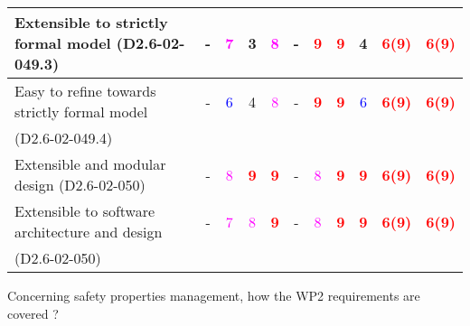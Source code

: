 \begin{tabular}{|l | c | c | c | c | c | c | c | c | c | c |}
\hline
Extensible to strictly formal model (D2.6-02-049.3) & - & \textcolor{magenta}{7} & 3     & \textcolor{magenta}{8} & - & \textcolor{red}{\textbf{9}} & \textcolor{red}{\textbf{9}} & 4     & \textcolor{red}{\textbf{6(9)}}  & \textcolor{red}{\textbf{6(9)}}  \\
\hline
Easy to  refine towards strictly formal model & - & \textcolor{blue}{6} & 4     & \textcolor{magenta}{8} & - & \textcolor{red}{\textbf{9}} & \textcolor{red}{\textbf{9}} & \textcolor{blue}{6} & \textcolor{red}{\textbf{6(9)}}  & \textcolor{red}{\textbf{6(9)}}  \\
(D2.6-02-049.4)  &  &      &  &  & & &  &    &   &   \\
\hline
Extensible and modular design (D2.6-02-050) & - & \textcolor{magenta}{8} & \textcolor{red}{\textbf{9}} & \textcolor{red}{\textbf{9}} & - & \textcolor{magenta}{8} & \textcolor{red}{\textbf{9}} & \textcolor{red}{\textbf{9}} & \textcolor{red}{\textbf{6(9)}}  & \textcolor{red}{\textbf{6(9)}}  \\
\hline
Extensible to software architecture and design  & - & \textcolor{magenta}{7} & \textcolor{magenta}{8} & \textcolor{red}{\textbf{9}} & - & \textcolor{magenta}{8} & \textcolor{red}{\textbf{9}} & \textcolor{red}{\textbf{9}} & \textcolor{red}{\textbf{6(9)}}  & \textcolor{red}{\textbf{6(9)}}  \\
(D2.6-02-050) &  &      &  &  & & &  &    &   &   \\
\hline
\end{tabular}

Concerning safety properties management, how the WP2 requirements are covered ?

